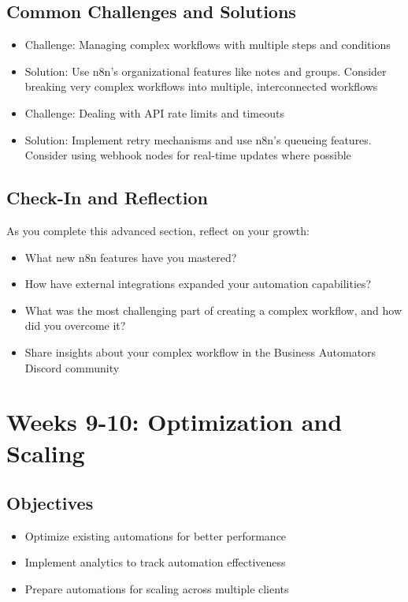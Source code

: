 \subsection{Common Challenges and Solutions}
\begin{itemize}
    \item Challenge: Managing complex workflows with multiple steps and conditions
    \item Solution: Use n8n's organizational features like notes and groups. Consider breaking very complex workflows into multiple, interconnected workflows

    \item Challenge: Dealing with API rate limits and timeouts
    \item Solution: Implement retry mechanisms and use n8n's queueing features. Consider using webhook nodes for real-time updates where possible
\end{itemize}

\subsection{Check-In and Reflection}
As you complete this advanced section, reflect on your growth:

\begin{itemize}
    \item What new n8n features have you mastered?
    \item How have external integrations expanded your automation capabilities?
    \item What was the most challenging part of creating a complex workflow, and how did you overcome it?
    \item Share insights about your complex workflow in the Business Automators Discord community
\end{itemize}

\section{Weeks 9-10: Optimization and Scaling}

\subsection{Objectives}
\begin{itemize}
    \item Optimize existing automations for better performance
    \item Implement analytics to track automation effectiveness
    \item Prepare automations for scaling across multiple clients
\end{itemize}

